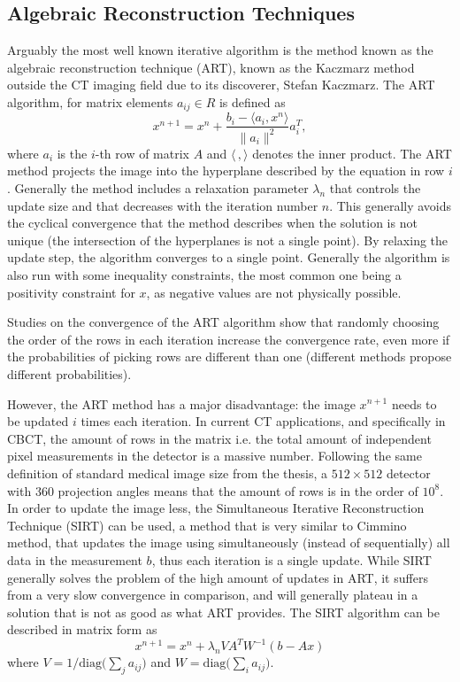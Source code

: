 \subsection{Algebraic Reconstruction Techniques}

Arguably the most well known iterative algorithm is the method known as the algebraic reconstruction technique (ART)\cite{K-1937}, known as the Kaczmarz method outside the CT imaging field due to its discoverer, Stefan Kaczmarz. The ART algorithm, for matrix elements $a_{ij}\in R$ is defined as
\begin{equation}
x^{n+1}=x^n+\frac{b_i-\langle a_i,x^n\rangle}{\lVert{a_i}\rVert^2}a_i^T,
\end{equation}
where $a_i$ is the $i$-th row of matrix $A$ and $\langle \,, \rangle$ denotes the inner product. The ART method projects the image into the hyperplane described by the equation in row $i$. Generally the method includes a relaxation parameter $\lambda_n$ that controls the update size and that decreases with the iteration number $n$. This generally avoids the cyclical convergence that the method describes when the solution is not unique (the intersection of the hyperplanes is not a single point). By relaxing the update step, the algorithm converges to a single point. Generally the algorithm is also run with some inequality constraints, the most common one being a positivity constraint for $x$, as negative values are not physically possible.

Studies on the convergence of the ART algorithm show\cite{herman1993algebraic} that randomly choosing the order of the rows in each iteration increase the convergence rate, even more if the probabilities of picking rows are different than one (different methods propose different probabilities)\cite{strohmer2009randomized}\cite{liu2016accelerated}. 

However, the ART method has a major disadvantage: the image $x^{n+1}$ needs to be updated $i$ times each iteration. In current CT applications, and specifically in CBCT, the amount of rows in the matrix i.e. the total amount of independent pixel measurements in the detector is a massive number. Following the same definition of standard medical image size from the thesis, a $512\times512$ detector with 360 projection angles means that the amount of rows is in the order of $10^8$. In order to update the image less, the Simultaneous Iterative Reconstruction Technique (SIRT)\cite{SIRT} can be used, a method that is very similar to Cimmino method\cite{cimmino1938cacolo}, that updates the image using simultaneously (instead of sequentially) all data in the measurement $b$, thus each iteration is a single update. While SIRT generally solves the problem of the high amount of updates in ART, it suffers from a very slow convergence in comparison, and will generally plateau in a solution that is not as good as what ART provides. The SIRT algorithm can be described in matrix form as
\begin{equation}
x^{n+1}=x^n+\lambda_n V A^T W^{-1}\left(b-Ax\right) \label{eq:SIRT}
\end{equation}
where $V=1/\text{diag}\bigl({\sum_j a_{ij}}\bigr)$ and  $W=\text{diag}\bigl({\sum_i a_{ij}}\bigr)$.

